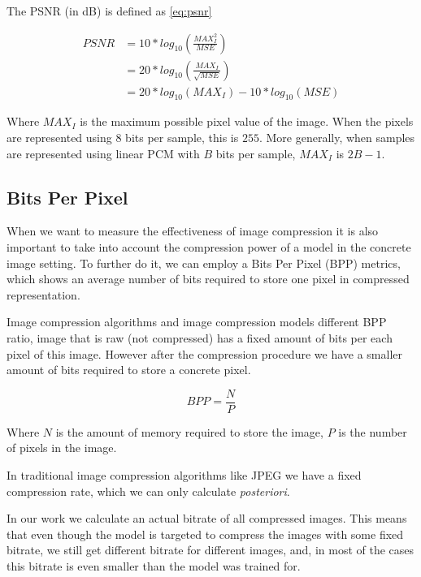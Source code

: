 The PSNR (in dB) is defined as \ref{eq:psnr}

\begin{equation}
    \label{eq:psnr}
    \begin{aligned}
        \mathit {PSNR} & = 10 * log_{10} \left(\frac{\mathit{{MAX}_{I}^{2}}}{\mathit {MSE}} \right)   \\
                       & = 20 * log_{10} \left(\frac{\mathit{{MAX}_{I}}}{\sqrt{\mathit{MSE}}} \right) \\
                       & = 20 * log_{10}(\mathit{{MAX}_{I}}) - 10 * log_{10}(\mathit{MSE})
    \end{aligned}
\end{equation}

Where $MAX_I$ is the maximum possible pixel value of the image. When the pixels are represented using $8$ bits per sample, this is $255$. More generally, when samples are represented using linear PCM with $B$ bits per sample, $MAX_I$ is $2B − 1$.

\subsection{Bits Per Pixel}

When we want to measure the effectiveness of image compression it is also important to take into account the compression power of a model in the concrete image setting. To further do it, we can employ a Bits Per Pixel (BPP) metrics, which shows an average number of bits required to store one pixel in compressed representation.

Image compression algorithms and image compression models different BPP ratio, image that is raw (not compressed) has a fixed amount of bits per each pixel of this image. However after  the compression procedure we have a smaller amount of bits required to store a concrete pixel.

\begin{equation}
    \label{eq:bpp}
    \mathit{BPP} = \frac{N}{P}
\end{equation}

Where $N$ is the amount of memory required to store the image, $P$ is the number of pixels in the image.

In traditional image compression algorithms like JPEG we have a fixed compression rate, which we can only calculate \textit{posteriori}.

In our work we calculate an actual bitrate of all compressed images. This means that even though the model is targeted to compress the images with some fixed bitrate, we still get different bitrate for different images, and, in most of the cases this bitrate is even smaller than the model was trained for.

